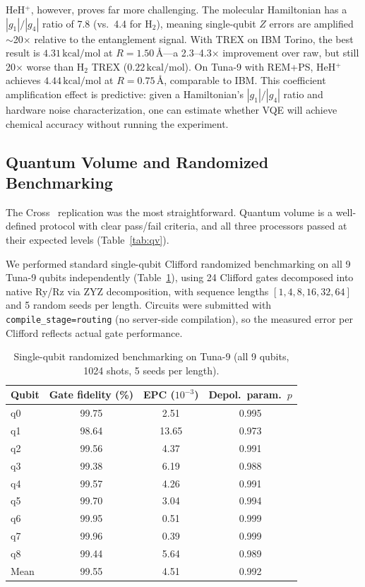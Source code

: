 \documentclass[twocolumn,prl,superscriptaddress,nofootinbib]{revtex4-2}
\newcommand{\kcalmol}{\,\text{kcal/mol}}
\begin{document}
HeH$^+$, however, proves far more challenging.
The molecular Hamiltonian has a $|g_1|/|g_4|$ ratio of 7.8 (vs.\ 4.4 for H$_2$), meaning single-qubit $Z$ errors are amplified $\sim$20$\times$ relative to the entanglement signal.
With TREX on IBM Torino, the best result is $4.31\kcalmol$ at $R = 1.50$\,\AA---a 2.3--4.3$\times$ improvement over raw, but still 20$\times$ worse than H$_2$ TREX ($0.22\kcalmol$).
On Tuna-9 with REM+PS, HeH$^+$ achieves $4.44\kcalmol$ at $R = 0.75$\,\AA, comparable to IBM.
This coefficient amplification effect is predictive: given a Hamiltonian's $|g_1|/|g_4|$ ratio and hardware noise characterization, one can estimate whether VQE will achieve chemical accuracy without running the experiment.

\subsection{Quantum Volume and Randomized Benchmarking}

The Cross~\cite{cross2019} replication was the most straightforward.
Quantum volume is a well-defined protocol with clear pass/fail criteria, and all three processors passed at their expected levels (Table~\ref{tab:qv}).

We performed standard single-qubit Clifford randomized benchmarking on all 9 Tuna-9 qubits independently (Table~\ref{tab:rb}), using 24 Clifford gates decomposed into native Ry/Rz via ZYZ decomposition, with sequence lengths $[1, 4, 8, 16, 32, 64]$ and 5 random seeds per length.
Circuits were submitted with \texttt{compile\_stage=routing} (no server-side compilation), so the measured error per Clifford reflects actual gate performance.

\begin{table}[h]
\caption{Single-qubit randomized benchmarking on Tuna-9 (all 9 qubits, 1024 shots, 5 seeds per length).}
\label{tab:rb}
\begin{ruledtabular}
\begin{tabular}{lccc}
Qubit & Gate fidelity (\%) & EPC ($10^{-3}$) & Depol.\ param.\ $p$ \\
\midrule
q0 & 99.75 & 2.51 & 0.995 \\
q1 & 98.64 & 13.65 & 0.973 \\
q2 & 99.56 & 4.37 & 0.991 \\
q3 & 99.38 & 6.19 & 0.988 \\
q4 & 99.57 & 4.26 & 0.991 \\
q5 & 99.70 & 3.04 & 0.994 \\
q6 & 99.95 & 0.51 & 0.999 \\
q7 & 99.96 & 0.39 & 0.999 \\
q8 & 99.44 & 5.64 & 0.989 \\
\midrule
Mean & 99.55 & 4.51 & 0.992 \\
\end{tabular}
\end{ruledtabular}
\end{table}
\end{document}
